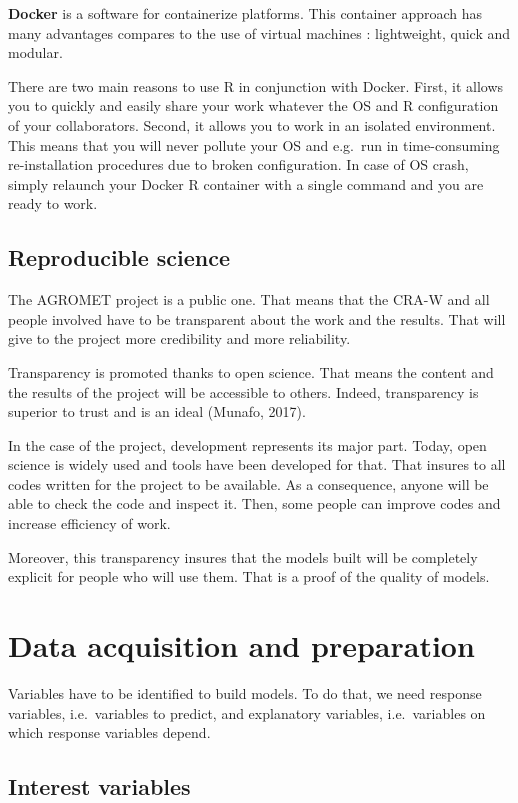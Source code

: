 \documentclass[12pt,twoside]{reedthesis}
\theoremstyle{definition}
\theoremstyle{definition}
\theoremstyle{definition}
\theoremstyle{remark}
\begin{document}
\textbf{Docker} is a software for containerize platforms. This container
approach has many advantages compares to the use of virtual machines :
lightweight, quick and modular.

There are two main reasons to use R in conjunction with Docker. First,
it allows you to quickly and easily share your work whatever the OS and
R configuration of your collaborators. Second, it allows you to work in
an isolated environment. This means that you will never pollute your OS
and e.g.~run in time-consuming re-installation procedures due to broken
configuration. In case of OS crash, simply relaunch your Docker R
container with a single command and you are ready to work.

\section{Reproducible science}\label{reproducible-science}

The AGROMET project is a public one. That means that the CRA-W and all
people involved have to be transparent about the work and the results.
That will give to the project more credibility and more reliability.

Transparency is promoted thanks to open science. That means the content
and the results of the project will be accessible to others. Indeed,
transparency is superior to trust and is an ideal (Munafo, 2017).

In the case of the project, development represents its major part.
Today, open science is widely used and tools have been developed for
that. That insures to all codes written for the project to be available.
As a consequence, anyone will be able to check the code and inspect it.
Then, some people can improve codes and increase efficiency of work.

Moreover, this transparency insures that the models built will be
completely explicit for people who will use them. That is a proof of the
quality of models.

\chapter{Data acquisition and preparation}\label{data-acq}

Variables have to be identified to build models. To do that, we need
response variables, i.e.~variables to predict, and explanatory
variables, i.e.~variables on which response variables depend.

\section{Interest variables}\label{interest-variables}
\end{document}
